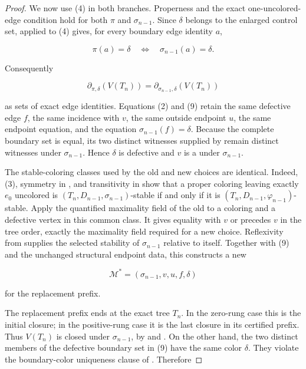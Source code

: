 \begin{proof}
We now use (4) in both branches.  Properness and the exact
one-uncolored-edge condition hold for both \(\pi\) and
\(\sigma_{n-1}\).  Since \(\delta\) belongs to the enlarged control
set,  applied to (4) gives, for every boundary edge identity
\(a\),

\[
 \pi(a)=\delta\quad\Longleftrightarrow\quad
 \sigma_{n-1}(a)=\delta.
\]

Consequently

\[
 \partial_{\pi,\delta}(V(T_n))
 =\partial_{\sigma_{n-1},\delta}(V(T_n))                    \tag{9}
\]

as sets of exact edge identities.  Equations (2) and (9) retain the
same defective edge \(f\), the same incidence with \(v\), the same
outside endpoint \(u\), the same endpoint equation, and the equation
\(\sigma_{n-1}(f)=\delta\).  Because the complete boundary set is
equal, its two distinct witnesses supplied by
 remain distinct witnesses under
\(\sigma_{n-1}\).  Hence \(\delta\) is defective and \(v\) is a
 under \(\sigma_{n-1}\).

The stable-coloring classes used by the old and new choices are identical.
Indeed, (3), symmetry in , and transitivity in
 show that a proper coloring leaving exactly \(e_0\)
uncolored is \((T_n,D_{n-1},\sigma_{n-1})\)-stable if and only if it is
\((T_n,D_{n-1},\varphi_{n-1})\)-stable.  Apply the quantified maximality
field of the old  to a coloring and a
defective vertex in this common class.  It gives equality with \(v\) or
precedes \(v\) in the tree order, exactly the maximality field required
for a new choice.  Reflexivity from  supplies the selected
stability of \(\sigma_{n-1}\) relative to itself.  Together with (9)
and the unchanged structural endpoint data, this constructs a new

\[
 \mathcal M^*=(\sigma_{n-1},v,u,f,\delta)                    \tag{10}
\]

for the replacement prefix.

The replacement prefix ends at the exact tree \(T_n\).  In the zero-rung
case this is the initial closure; in the positive-rung case it is the
last closure in its certified prefix.  Thus \(V(T_n)\) is closed under
\(\sigma_{n-1}\), by  and
.  On the other hand, the two distinct
members of the defective boundary set in (9) have the same color
\(\delta\).  They violate the boundary-color uniqueness clause of
.  Therefore


\end{proof}
